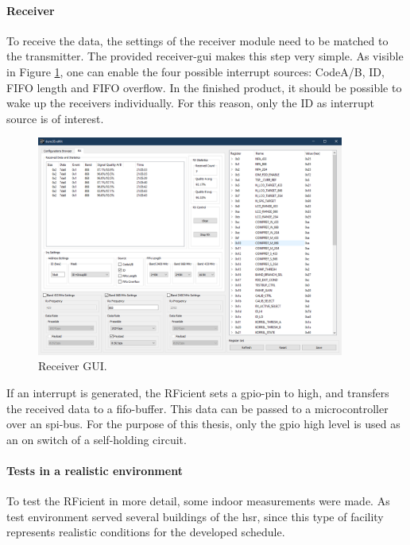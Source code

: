 \paragraph{Receiver}
To receive the data, the settings of the receiver module need to be matched to the transmitter.
The provided receiver-\acs{gui} makes this step very simple.
As visible in Figure \ref{development:rx}, one can enable the four possible interrupt sources: CodeA/B, ID, FIFO length and FIFO overflow.
In the finished product, it should be possible to wake up the receivers individually.
For this reason, only the ID as interrupt source is of interest.
\begin{figure}[ht]
	\centering
	\includegraphics[width=0.9\textwidth]{4-development/hardware/graphics/RXgui.png}
	\caption{Receiver GUI.\label{development:rx}}
\end{figure}
If an interrupt is generated, the RFicient sets a \acs{gpio}-pin to high, and transfers the received data to a \acs{fifo}-buffer.
This data can be passed to a microcontroller over an \acs{spi}-bus.
For the purpose of this thesis, only the \acs{gpio} high level is used as an on switch of a self-holding circuit.

\paragraph{Tests in a realistic environment}
To test the RFicient in more detail, some indoor measurements were made.
As test environment served several buildings of the \acf{hsr}, since this type of facility represents realistic conditions for the developed schedule.

